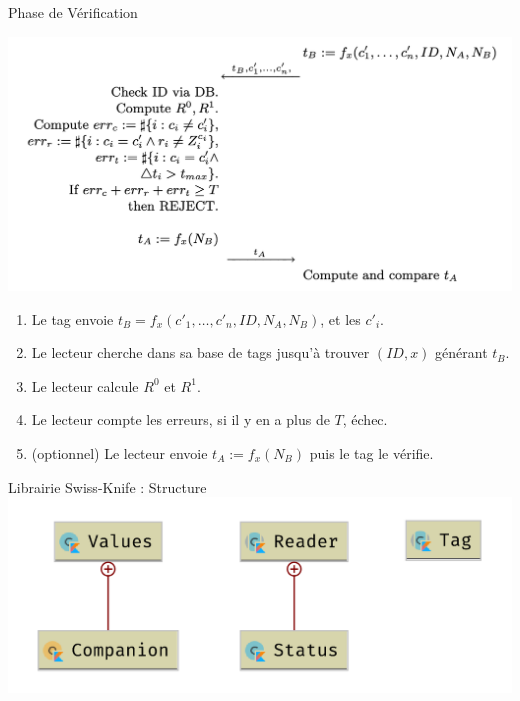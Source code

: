 \documentclass[aspectratio=169]{beamer}
\begin{document}
\begin{frame}{Phase de Vérification}
  \begin{multicols}{2}
    \begin{minipage}[c]{\linewidth}
      \centering
      \bigskip
      \bigskip
      \bigskip
      \includegraphics[width=\linewidth]{../assets/sk-phase3}
    \end{minipage}

    \begin{minipage}[t]{\linewidth}
      \begin{enumerate}
        \item Le tag envoie $t_B = f_x(c'_1, \hdots, c'_n, ID, N_A, N_B)$, et les $c'_i$.
        \item Le lecteur cherche dans sa base de tags jusqu'à trouver $(ID, x)$ générant $t_B$.
        \item Le lecteur calcule $R^0$ et $R^1$.
        \item Le lecteur compte les erreurs, si il y en a plus de $T$, échec.
        \item (optionnel) Le lecteur envoie $t_A := f_x(N_B)$ puis le tag le vérifie.
      \end{enumerate}
    \end{minipage}
  \end{multicols}
\end{frame}

\begin{frame}{Librairie Swiss-Knife : Structure}
  \centering
  \includegraphics[width=.8\linewidth]{../assets/uml_jar.png}
\end{frame}
\end{document}
